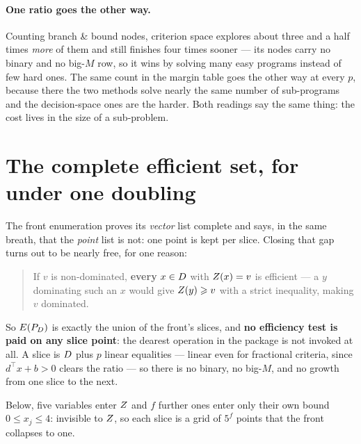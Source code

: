 \documentclass[11pt,a4paper]{article}
\begin{document}
\paragraph{One ratio goes the other way.}  Counting branch \& bound nodes,
criterion space explores about three and a half times \emph{more} of them and
still finishes four times sooner --- its nodes carry no binary and no big-$M$
row, so it wins by solving many easy programs instead of few hard ones.  The
same count in the margin table goes the other way at every $p$, because there
the two methods solve nearly the same number of sub-programs and the
decision-space ones are the harder.  Both readings say the same thing: the cost
lives in the size of a sub-problem.

\section{The complete efficient set, for under one doubling}

The front enumeration proves its \emph{vector} list complete and says, in the
same breath, that the \emph{point} list is not: one point is kept per slice.
Closing that gap turns out to be nearly free, for one reason:

\begin{quote}
If $v$ is non-dominated, \textbf{every} $x \in D$ with $Z(x) = v$ is
efficient --- a $y$ dominating such an $x$ would give $Z(y) \geqslant v$ with
a strict inequality, making $v$ dominated.
\end{quote}

\noindent
So $E(P_{D})$ is exactly the union of the front's slices, and \textbf{no efficiency
test is paid on any slice point}: the dearest operation in the package is not
invoked at all.  A slice is $D$ plus $p$ linear equalities --- linear even
for fractional criteria, since $d^{\top}x + b > 0$ clears the ratio --- so
there is no binary, no big-$M$, and no growth from one slice to the next.

Below, five variables enter $Z$ and $f$ further ones enter only their own
bound $0 \leqslant x_j \leqslant 4$: invisible to $Z$, so each slice is a grid
of $5^{f}$ points that the front collapses to one.
\end{document}
